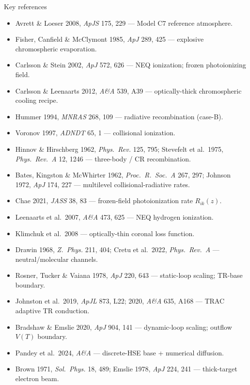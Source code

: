 \documentclass[aspectratio=169]{beamer}
\begin{document}
\begin{frame}[allowframebreaks]{Key references}
  \scriptsize
  \begin{itemize}
    \item Avrett \& Loeser 2008, \emph{ApJS} 175, 229 — Model C7 reference atmosphere.
    \item Fisher, Canfield \& McClymont 1985, \emph{ApJ} 289, 425 — explosive chromospheric evaporation.
    \item Carlsson \& Stein 2002, \emph{ApJ} 572, 626 — NEQ ionization; frozen photoionizing field.
    \item Carlsson \& Leenaarts 2012, \emph{A\&A} 539, A39 — optically-thick chromospheric cooling recipe.
    \item Hummer 1994, \emph{MNRAS} 268, 109 — radiative recombination (case-B).
    \item Voronov 1997, \emph{ADNDT} 65, 1 — collisional ionization.
    \item Hinnov \& Hirschberg 1962, \emph{Phys.\ Rev.} 125, 795; Stevefelt et al.\ 1975,
      \emph{Phys.\ Rev.\ A} 12, 1246 — three-body / CR recombination.
    \item Bates, Kingston \& McWhirter 1962, \emph{Proc.\ R.\ Soc.\ A} 267, 297; Johnson 1972,
      \emph{ApJ} 174, 227 — multilevel collisional-radiative rates.
    \item Chae 2021, \emph{JASS} 38, 83 — frozen-field photoionization rate $R_{ik}(z)$.
    \item Leenaarts et al.\ 2007, \emph{A\&A} 473, 625 — NEQ hydrogen ionization.
    \item Klimchuk et al.\ 2008 — optically-thin coronal loss function.
    \item Drawin 1968, \emph{Z.\ Phys.} 211, 404; Cretu et al.\ 2022, \emph{Phys.\ Rev.\ A} — neutral/molecular channels.
    \item Rosner, Tucker \& Vaiana 1978, \emph{ApJ} 220, 643 — static-loop scaling; TR-base boundary.
    \item Johnston et al.\ 2019, \emph{ApJL} 873, L22; 2020, \emph{A\&A} 635, A168 — TRAC adaptive TR conduction.
    \item Bradshaw \& Emslie 2020, \emph{ApJ} 904, 141 — dynamic-loop scaling; outflow $V(T)$ boundary.
    \item Pandey et al.\ 2024, \emph{A\&A} — discrete-HSE base + numerical diffusion.
    \item Brown 1971, \emph{Sol.\ Phys.} 18, 489; Emslie 1978, \emph{ApJ} 224, 241 — thick-target electron beam.

\end{itemize}
\end{frame}
\end{document}
